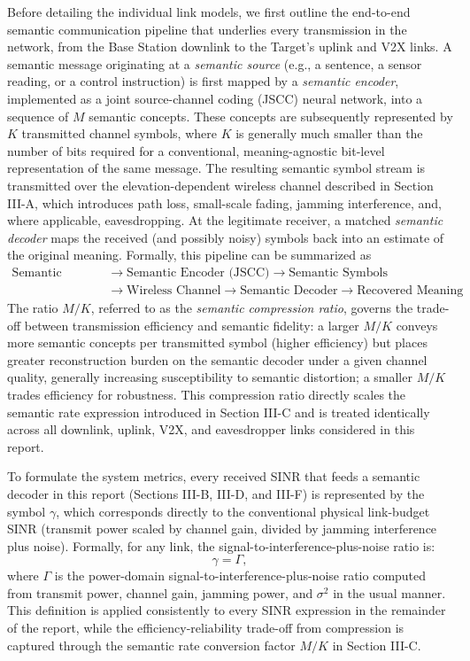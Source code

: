 \documentclass[journal,onecolumn]{IEEEtran}
\begin{document}
Before detailing the individual link models, we first outline the end-to-end semantic communication pipeline that underlies every transmission in the network, from the Base Station downlink to the Target's uplink and V2X links. A semantic message originating at a \emph{semantic source} (e.g., a sentence, a sensor reading, or a control instruction) is first mapped by a \emph{semantic encoder}, implemented as a joint source-channel coding (JSCC) neural network, into a sequence of $M$ semantic concepts. These concepts are subsequently represented by $K$ transmitted channel symbols, where $K$ is generally much smaller than the number of bits required for a conventional, meaning-agnostic bit-level representation of the same message. The resulting semantic symbol stream is transmitted over the elevation-dependent wireless channel described in Section III-A, which introduces path loss, small-scale fading, jamming interference, and, where applicable, eavesdropping. At the legitimate receiver, a matched \emph{semantic decoder} maps the received (and possibly noisy) symbols back into an estimate of the original meaning. Formally, this pipeline can be summarized as
\[
\begin{aligned}
\text{Semantic Source}
&\rightarrow \text{Semantic Encoder (JSCC)}
\rightarrow \text{Semantic Symbols} \\
&\rightarrow \text{Wireless Channel}
\rightarrow \text{Semantic Decoder}
\rightarrow \text{Recovered Meaning}
\end{aligned}
\]
The ratio $M/K$, referred to as the \emph{semantic compression ratio}, governs the trade-off between transmission efficiency and semantic fidelity: a larger $M/K$ conveys more semantic concepts per transmitted symbol (higher efficiency) but places greater reconstruction burden on the semantic decoder under a given channel quality, generally increasing susceptibility to semantic distortion; a smaller $M/K$ trades efficiency for robustness. This compression ratio directly scales the semantic rate expression introduced in Section III-C and is treated identically across all downlink, uplink, V2X, and eavesdropper links considered in this report.

To formulate the system metrics, every received SINR that feeds a semantic decoder in this report (Sections III-B, III-D, and III-F) is represented by the symbol $\gamma$, which corresponds directly to the conventional physical link-budget SINR (transmit power scaled by channel gain, divided by jamming interference plus noise). Formally, for any link, the signal-to-interference-plus-noise ratio is:
\begin{equation}
    \gamma = \Gamma,
\end{equation}
where $\Gamma$ is the power-domain signal-to-interference-plus-noise ratio computed from transmit power, channel gain, jamming power, and $\sigma^2$ in the usual manner. This definition is applied consistently to every SINR expression in the remainder of the report, while the efficiency-reliability trade-off from compression is captured through the semantic rate conversion factor $M/K$ in Section III-C.
\end{document}
